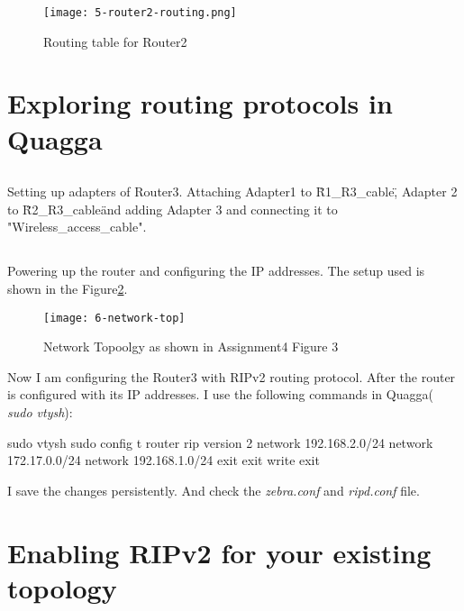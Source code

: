 \documentclass{article}
\begin{document}
\begin{figure}[h]
    \texttt{[image: 5-router2-routing.png]}
    \label{fig:5-router2-route}
    \caption{Routing table for Router2}
\end{figure}


\subsection{}

\subsection{}


\section{Exploring routing protocols in Quagga}

\subsection{} 
Setting up adapters of Router3. Attaching Adapter1 to \"R1\_R3\_cable\", Adapter 2 to \"R2\_R3\_cable\" and adding Adapter 3 and connecting it to "Wireless\_access\_cable". 

\subsection{}
Powering up the router and configuring the IP addresses.
The setup used is shown in the Figure{\ref{fig:6-net-top}}. 

\begin{figure}[h]
    \texttt{[image: 6-network-top]}
    \label{fig:6-net-top}
    \caption{Network Topoolgy as shown in Assignment4 Figure 3}
\end{figure}

Now I am configuring the Router3 with RIPv2 routing protocol. 
After the router is configured with its IP addresses. I use the following commands in Quagga( \textit{sudo vtysh}): 

sudo vtysh 
sudo config t 
router rip 
version 2 
network 192.168.2.0/24
network 172.17.0.0/24
network 192.168.1.0/24
exit
exit
write 
exit 

I save the changes persistently. And check the \textit{zebra.conf} and \textit{ripd.conf} file. 


\section{Enabling RIPv2 for your existing topology}
\end{document}
